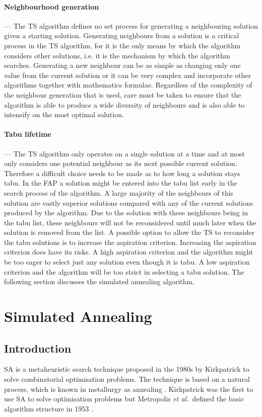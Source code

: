 \paragraph{Neighbourhood generation}
--- The \gls{TS} algorithm defines no set process for generating a neighbouring solution given a starting solution. Generating neighbours from a solution is a critical process in the \gls{TS} algorithm, for it is the only means by which the algorithm considers other solutions, i.e. it is the mechanism by which the algorithm searches. Generating a new neighbour can be as simple as changing only one value from the current solution or it can be very complex and incorporate other algorithms together with mathematics formulae. Regardless of the complexity of the neighbour generation that is used, care must be taken to ensure that the algorithm is able to produce a wide diversity of neighbours and is also able to intensify on the most optimal solution.
\paragraph{Tabu lifetime}
--- The \gls{TS} algorithm only operates on a single solution at a time and at most only considers one potential neighbour as its next possible current solution. Therefore a difficult choice needs to be made as to how long a solution stays tabu. In the \gls{FAP} a solution might be entered into the tabu list early in the search process of the algorithm. A large majority of the neighbours of this solution are vastly superior solutions compared with any of the current solutions produced by the algorithm. Due to the solution with these neighbours being in the tabu list, these neighbours will not be reconsidered until much later when the solution is removed from the list. A possible option to allow the \gls{TS} to reconsider the tabu solutions is to increase the aspiration criterion. Increasing the aspiration criterion does have its risks. A high aspiration criterion and the algorithm might be too eager to select just any solution even though it is tabu. A low aspiration criterion and the algorithm will be too strict in selecting a tabu solution. The following section discusses the simulated annealing algorithm.
\section{Simulated Annealing}
\label{sec:simulatedannealing}

\subsection{Introduction}
\label{sec:SAIntroduction}
\Gls{SA} is a metaheuristic search technique proposed in the 1980s by Kirkpatrick to solve combinatorial optimisation problems. The technique is based on a natural process, which is known in metallurgy as annealing \cite{SASingleMultiObj,TempCyclingSA}. Kirkpatrick was the first to use \gls{SA} to solve optimisation problems but Metropolis \emph{et al.}\ defined the basic algorithm structure in 1953 \cite{CurveFittingSA,VeryFastSAImageEnchancement}.

